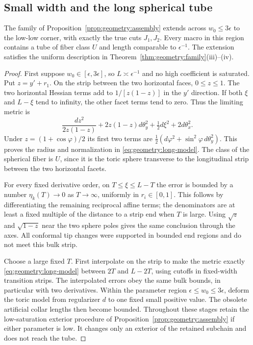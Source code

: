 \subsection{Small width and the long spherical tube}

\begin{lemma}
\label{lem:geometry:tube}
The family of Proposition~\ref{prop:geometry:assembly} extends
across $w_0\le3\epsilon$ to the low-low corner, with exactly
the true cuts $J_1,J_2$.  Every macro in this region contains
a tube of fiber class $U$ and length comparable to
$\epsilon^{-1}$.  The extension satisfies the uniform
description in Theorem~\ref{thm:geometry:family}\textup{(iii)--(iv)}.
\end{lemma}

\begin{proof}
First suppose $w_0\in[\epsilon,3\epsilon]$, so
$L\asymp\epsilon^{-1}$ and no high coefficient is saturated.
Put $z=y'+r_1$.  On the strip between the two horizontal
faces, $0\le z\le1$.  The two horizontal Hessian terms add
to $1/[z(1-z)]$ in the $y'$ direction.  If both $\xi$ and
$L-\xi$ tend to infinity, the other facet terms tend to zero.
Thus the limiting metric is
\begin{equation}
 \frac{dz^2}{2z(1-z)}+2z(1-z)d\theta_y^2
       +\tfrac12d\xi^2+2d\theta_x^2.
 \label{eq:geometry:explicit-tube}
\end{equation}
Under $z=(1+\cos\varphi)/2$ its first two terms are
$\tfrac12(d\varphi^2+\sin^2\varphi\,d\theta_y^2)$.
This proves the radius and normalization in
\eqref{eq:geometry:long-model}.  The class of the spherical
fiber is $U$, since it is the toric sphere transverse to
the longitudinal strip between the two horizontal facets.

For every fixed derivative order, on
$T\le\xi\le L-T$ the error is bounded by a number
$\eta_k(T)\to0$ as $T\to\infty$, uniformly in $r_i\in[0,1]$.
This follows by differentiating the remaining reciprocal
affine terms; the denominators are at least a fixed
multiple of the distance to a strip end when $T$ is large.
Using $\sqrt z$ and $\sqrt{1-z}$ near the two sphere poles
gives the same conclusion through the axes.  All conformal
tip changes were supported in bounded end regions and
do not meet this bulk strip.

Choose a large fixed $T$.  First interpolate on the strip
to make the metric exactly \eqref{eq:geometry:long-model}
between $2T$ and $L-2T$, using cutoffs in fixed-width
transition strips.  The interpolated errors obey the same
bulk bounds, in particular with two derivatives.  Within the parameter
region $\epsilon\le w_0\le3\epsilon$, deform the toric model from regularizer $d$
to one fixed small positive value.  The obsolete
artificial collar lengths then become bounded.  Throughout
these stages retain the low-saturation exterior procedure
of Proposition~\ref{prop:geometry:assembly} if either
parameter is low.  It changes only an exterior of the
retained subchain and does not reach the tube.


\end{proof}
